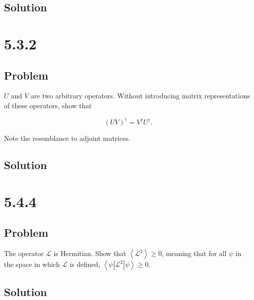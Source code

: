 \documentclass[12pt]{article}
\begin{document}
\subsection{Solution}

\newpage
\section{5.3.2}

\subsection{Problem}

\(U\) and \(V\) are two arbitrary operators. Without introducing matrix representations of these operators, show that

\[
{(U V)}^{\dagger}=V^{\dagger} U^{\dagger} .
\]

Note the resemblance to adjoint matrices.

\subsection{Solution}

\newpage
\section{5.4.4}

\subsection{Problem}

The operator \(\mathcal{L}\) is Hermitian. Show that \(\left\langle\mathcal{L}^2\right\rangle \geq 0\), meaning that for all \(\psi\) in the space in which \(\mathcal{L}\) is defined, \(\left\langle\psi\left|\mathcal{L}^2\right| \psi\right\rangle \geq 0\).

\subsection{Solution}

\newpage


\nocite{El-Deeb_PEU-356_Assignments}
\end{document}
